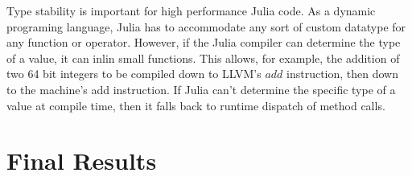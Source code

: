 \documentclass{article}
\begin{document}
Type stability is important for high performance Julia code.
As a dynamic programing language, Julia has to accommodate any sort of custom
datatype for any function or operator.
However, if the Julia compiler can determine the type of a value, it can inlin small functions.
This allows, for example, the addition of two 64 bit integers to be compiled down
to LLVM's \(add\) instruction, then down to the machine's add instruction.
If Julia can't determine the specific type of a value at compile time, then it
falls back to runtime dispatch of method calls.





\section{Final Results}
	
	


\end{document}
